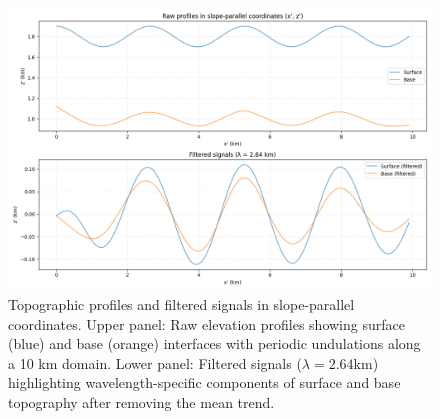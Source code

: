 \begin{figure}
    \includegraphics[scale=0.5]{base_surf_overlap.png}
    \caption{Topographic profiles and filtered signals in slope-parallel coordinates. Upper panel: Raw elevation profiles showing surface (blue) and base (orange) interfaces with periodic undulations along a 10 km domain. Lower panel: Filtered signals ($\lambda = 2.64$km) highlighting wavelength-specific components of surface and base topography after removing the mean trend.}
    \label{fig:overlap}
\end{figure}
